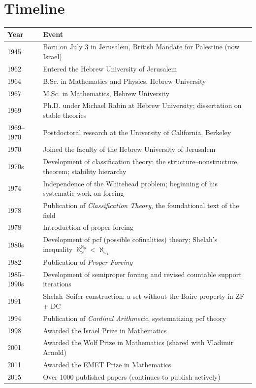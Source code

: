 \section*{Timeline}
\begin{tabular}{|p{2.5cm}|p{12cm}|}
\hline
\textbf{Year} & \textbf{Event} \\ \hline
1945 & Born on July 3 in Jerusalem, British Mandate for Palestine (now Israel) \\ \hline
1962 & Entered the Hebrew University of Jerusalem \\ \hline
1964 & B.Sc. in Mathematics and Physics, Hebrew University \\ \hline
1967 & M.Sc. in Mathematics, Hebrew University \\ \hline
1969 & Ph.D. under Michael Rabin at Hebrew University; dissertation on stable theories \\ \hline
1969--1970 & Postdoctoral research at the University of California, Berkeley \\ \hline
1970 & Joined the faculty of the Hebrew University of Jerusalem \\ \hline
1970s & Development of classification theory; the structure--nonstructure theorem; stability hierarchy \\ \hline
1974 & Independence of the Whitehead problem; beginning of his systematic work on forcing \\ \hline
1978 & Publication of \textit{Classification Theory}, the foundational text of the field \\ \hline
1978 & Introduction of proper forcing \\ \hline
1980s & Development of pcf (possible cofinalities) theory; Shelah's inequality \(\aleph_\omega^{\aleph_0} < \aleph_{\omega_4}\) \\ \hline
1982 & Publication of \textit{Proper Forcing} \\ \hline
1985--1990s & Development of semiproper forcing and revised countable support iterations \\ \hline
1991 & Shelah--Soifer construction: a set without the Baire property in ZF + DC \\ \hline
1994 & Publication of \textit{Cardinal Arithmetic}, systematizing pcf theory \\ \hline
1998 & Awarded the Israel Prize in Mathematics \\ \hline
2001 & Awarded the Wolf Prize in Mathematics (shared with Vladimir Arnold) \\ \hline
2011 & Awarded the EMET Prize in Mathematics \\ \hline
2015 & Over 1000 published papers (continues to publish actively) \\ \hline
\end{tabular}

